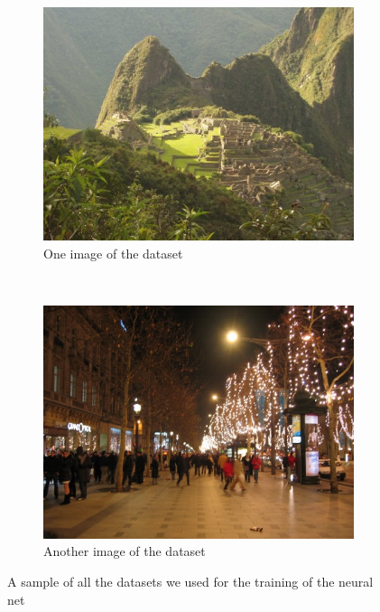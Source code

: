 \documentclass[11pt]{report}
\begin{document}
\begin{figure}
	\centering
	\begin{subfigure}[b]{0.45\textwidth}
		\includegraphics[width=\textwidth]{../iaprtc12/images/24/24019.jpg}
		\caption{One image of the dataset}
		\label{img:432}
	\end{subfigure}
	~
	\begin{subfigure}[b]{0.45\textwidth}
		\includegraphics[width=\textwidth]{../iaprtc12/images/37/37142.jpg}
		\caption{Another image of the dataset}
		\label{img:540}
	\end{subfigure}
	
	\caption{A sample of all the datasets we used for the training of the neural net}
	\label{fig:IAPR-database}
\end{figure}
\end{document}
